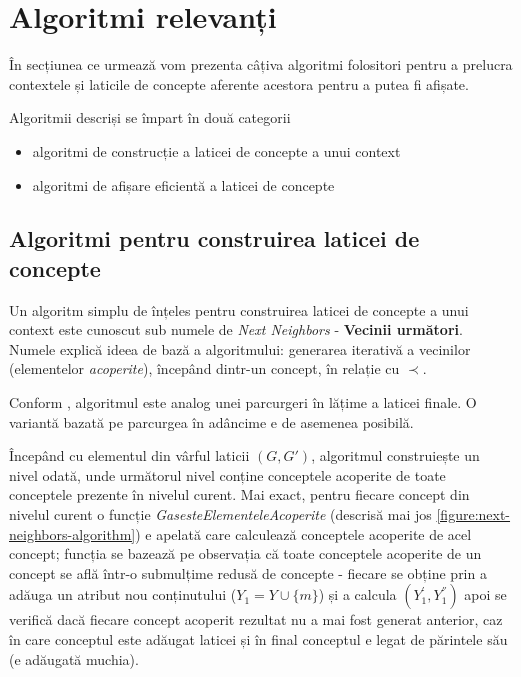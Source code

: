 \documentclass[12pt, a4paper, twoside, romanian]{teza-upb}
\begin{document}
  \section{Algoritmi relevanți}

    În secțiunea ce urmează vom prezenta câțiva algoritmi folositori pentru a prelucra contextele și laticile de concepte aferente acestora pentru a putea fi afișate.

    Algoritmii descriși se împart în două categorii
    \begin{itemize}
      \item algoritmi de construcție a laticei de concepte a unui context
      \item algoritmi de afișare eficientă a laticei de concepte
    \end{itemize}

    
    \subsection{Algoritmi pentru construirea laticei de concepte}

    Un algoritm simplu de înțeles pentru construirea laticei de concepte a unui context este cunoscut sub numele de \textit{Next Neighbors} - \textbf{Vecinii următori}. Numele explică ideea de bază a algoritmului: generarea iterativă a vecinilor (elementelor \textit{acoperite}), începând dintr-un concept, în relație cu $\prec$.

    Conform \cite{Carpineto:2004:CDA:975252}, algoritmul este analog unei parcurgeri în lățime a laticei finale. O variantă bazată pe parcurgea în adâncime e de asemenea posibilă.

      Începând cu elementul din vârful laticii $(G, G')$, algoritmul construiește un nivel odată, unde următorul nivel conține conceptele acoperite de toate conceptele prezente în nivelul curent. Mai exact, pentru fiecare concept din nivelul curent o funcție \textit{GasesteElementeleAcoperite} (descrisă mai jos \ref{figure:next-neighbors-algorithm}) e apelată care calculează conceptele acoperite de acel concept; funcția se bazează pe observația că toate conceptele acoperite de un concept se află într-o submulțime redusă de concepte - fiecare se obține prin a adăuga un atribut nou conținutului ($Y_1 = Y \cup \{m\}$) și a calcula $(Y_{1}^{'}, Y_{1}^{''})$  apoi se verifică dacă fiecare concept acoperit rezultat nu a mai fost generat anterior, caz în care conceptul este adăugat laticei și în final conceptul e legat de părintele său (e adăugată muchia).
\end{document}
